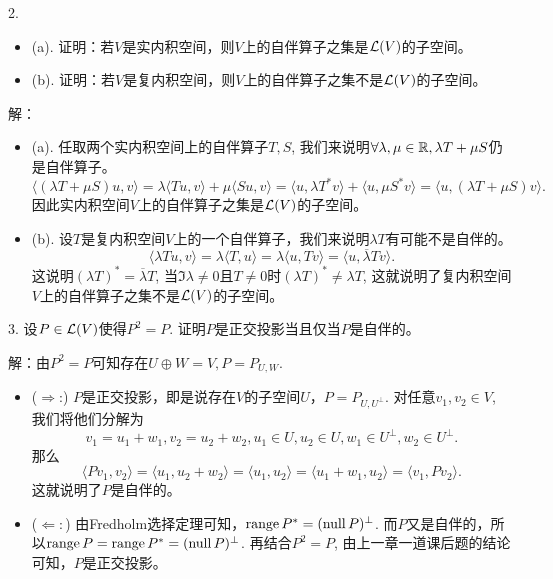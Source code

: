 \documentclass[hyperref,]{ctexart}
\providecommand{\tightlist}{%
  \setlength{\itemsep}{0pt}\setlength{\parskip}{0pt}}
\begin{document}
\bigskip

\noindent{} 2.

\begin{itemize}
\tightlist
\item
  (a).
  证明：若\(V\)是实内积空间，则\(V\)上的自伴算子之集是\(\mathcal{L}(V)\)的子空间。
\item
  (b).
  证明：若\(V\)是复内积空间，则\(V\)上的自伴算子之集不是\(\mathcal{L}(V)\)的子空间。
\end{itemize}

\smallskip

\noindent{} 解：

\begin{itemize}
\item
  (a). 任取两个实内积空间上的自伴算子\(T,S\),
  我们来说明\(\forall \lambda,\mu\in\mathbb{R},\lambda T+\mu S\)仍是自伴算子。
  \[\langle (\lambda T+\mu S)u,v\rangle = \lambda \langle Tu,v\rangle+\mu\langle Su,v\rangle=\langle u,\lambda T^*v\rangle+\langle u,\mu S^*v\rangle=\langle u,(\lambda T+\mu S)v\rangle.\]
  因此实内积空间\(V\)上的自伴算子之集是\(\mathcal{L}(V)\)的子空间。
\item
  (b).
  设\(T\)是复内积空间\(V\)上的一个自伴算子，我们来说明\(\lambda T\)有可能不是自伴的。
  \[\langle \lambda Tu,v\rangle = \lambda\langle T,u\rangle=\lambda\langle u,Tv\rangle=\langle u,\overline{\lambda}Tv\rangle.\]
  这说明\((\lambda T)^* = \overline{\lambda} T\),
  当\(\Im\lambda\ne0\)且\(T\ne 0\)时\((\lambda T)^*\ne\lambda T\),
  这就说明了复内积空间\(V\)上的自伴算子之集不是\(\mathcal{L}(V)\)的子空间。
\end{itemize}

\bigskip

\noindent{} 3. 设\(P\in\mathcal{L}(V)\)使得\(P^2=P\).
证明\(P\)是正交投影当且仅当\(P\)是自伴的。

\smallskip

\noindent{} 解：由\(P^2=P\)可知存在\(U\oplus W=V,P=P_{U,W}\).

\begin{itemize}
\item
  (\(\Rightarrow\):)
  \(P\)是正交投影，即是说存在\(V\)的子空间\(U\)，\(P=P_{U,U^\perp}\).
  对任意\(v_1,v_2\in V\), 我们将他们分解为
  \[v_1 = u_1+w_1,v_2=u_2+w_2,u_1\in U,u_2\in U,w_1\in U^\perp, w_2\in U^\perp.\]
  那么
  \[\langle Pv_1,v_2\rangle = \langle u_1,u_2+w_2\rangle = \langle u_1,u_2\rangle =\langle u_1+w_1,u_2\rangle=\langle v_1,Pv_2\rangle.\]
  这就说明了\(P\)是自伴的。
\item
  (\(\Leftarrow:\))
  由Fredholm选择定理可知，\(\mathrm{range}\, P^*=(\mathrm{null}\, P)^\perp\).
  而\(P\)又是自伴的，所以\(\mathrm{range}\, P=\mathrm{range}\, P^*=(\mathrm{null}\, P)^\perp\).
  再结合\(P^2=P\), 由上一章一道课后题的结论可知，\(P\)是正交投影。
\end{itemize}
\end{document}
